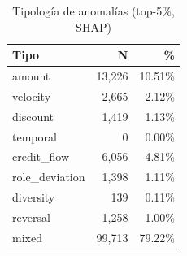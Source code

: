 \begin{table}[htbp]
\centering
\small
\caption{Tipología de anomalías (top-5\%, SHAP)}
\label{tab:anomaly-types}
\begin{tabular}{lrr}
\toprule
Tipo & N & \% \\
\midrule
  amount & 13,226 & 10.51\% \\
  velocity & 2,665 & 2.12\% \\
  discount & 1,419 & 1.13\% \\
  temporal & 0 & 0.00\% \\
  credit\_flow & 6,056 & 4.81\% \\
  role\_deviation & 1,398 & 1.11\% \\
  diversity & 139 & 0.11\% \\
  reversal & 1,258 & 1.00\% \\
  mixed & 99,713 & 79.22\% \\
\bottomrule
\end{tabular}
\end{table}

